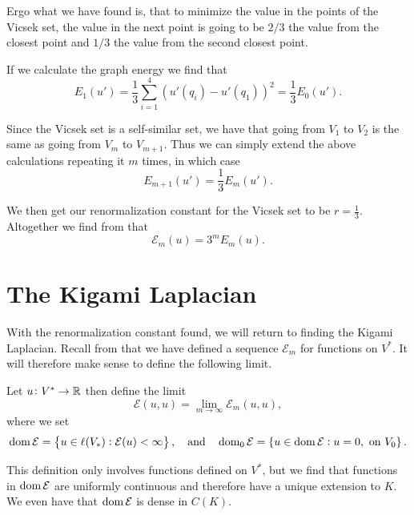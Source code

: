 Ergo what we have found is, that to minimize the value in the points of the Vicsek set, the value in the next point is going to be $2/3$ the value from the closest point and $1/3$ the value from the second closest point. 

If we calculate the graph energy we find that
\begin{equation}
	E_1(u') =\frac{1}{3}\sum_{i = 1}^{4}(u'(q_i) - u'(q_1))^2 = \frac{1}{3}E_0(u').
\end{equation}

Since the Vicsek set is a self-similar set, we have that going from $V_1$ to $V_2$ is the same as going from $V_m$ to $V_{m+1}$. Thus we can simply extend the above calculations repeating it $m$ times, in which case
\begin{equation}
	E_{m+1}(u') = \frac{1}{3}E_m(u').
\end{equation}

We then get our renormalization constant for the Vicsek set to be $r = \frac{1}{3}$. Altogether we find from  that
\begin{equation}
	\mathcal{E}_{m}(u) = 3^{m} E_{m}(u).
\end{equation}


\section{The Kigami Laplacian}
With the renormalization constant found, we will return to finding the Kigami Laplacian. Recall from  that we have defined a sequence $\mathcal{E}_m$ for functions on $V^{*}$. It will therefore make sense to define the following limit.

\medskip
\begin{defi}\label{renormalizedGraphEnergiesLimit} Let $u\colon V^{*} \to \mathbb{R}$ then define the limit
	\begin{equation}
		\mathcal{E}(u, u) = \lim_{m \to \infty} \mathcal{E}_{m}(u, u),
	\end{equation}
	where we set
	\begin{equation}
		\dom \mathcal{E} = \cbr{u \in \ell(V_{*}) : \mathcal{E}(u) < \infty},\quad \text{and} \quad \dom_0 \mathcal{E} = \cbr{u \in \dom \mathcal{E} : u = 0,\text{ on } V_0 }.
	\end{equation}
\end{defi}

This definition only involves functions defined on $V^{*}$, but we find that functions in $\operatorname{dom} \mathcal{E}$ are uniformly continuous and therefore have a unique extension to $K$. We even have that $\operatorname{dom} \mathcal{E}$ is dense in $C(K)$.

